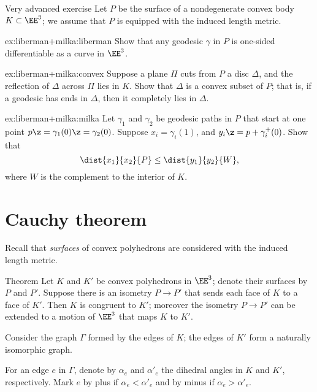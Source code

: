 \begin{thm}{Very advanced exercise}\label{ex:liberman+milka}
Let $P$ be the surface of a nondegenerate convex body $K\subset\EE^3$;
we assume that $P$ is equipped with the induced length metric.

\begin{subthm}{ex:liberman+milka:liberman}
Show that any geodesic $\gamma$ in $P$ is one-sided differentiable as a curve in $\EE^3$.
\end{subthm}

\begin{subthm}{ex:liberman+milka:convex}
Suppose a plane $\Pi$ cuts from $P$ a disc $\Delta$, and the reflection of $\Delta$ across $\Pi$ lies in $K$.
Show that $\Delta$ is a convex subset of $P$;
that is, if a geodesic has ends in $\Delta$, then it completely lies in $\Delta$.
\end{subthm}


\begin{subthm}{ex:liberman+milka:milka}
Let $\gamma_1$ and $\gamma_2$ be geodesic paths in $P$ that start at one point $p\z=\gamma_1(0)\z=\gamma_2(0)$.
Suppose $x_i=\gamma_i(1)$, and $y_i\z=p+\gamma_i^+(0)$.
Show that
\[\dist{x_1}{x_2}{P}\le \dist{y_1}{y_2}{W},\]
where $W$ is the complement to the interior of $K$.
\end{subthm}

\end{thm}


\section{Cauchy theorem}

Recall that \textit{surfaces} of convex polyhedrons are considered with the induced length metric.
 
\begin{thm}{Theorem}\label{thm:cauchy}
Let $K$ and $K'$ be convex polyhedrons in $\EE^3$;
denote their surfaces 
by $P$ and $P'$.
Suppose there is an isometry $P\to P'$ that sends each face of $K$ to a face of $K'$.
Then $K$ is congruent to $K'$; moreover the isometry $P\to P'$ can be extended to a motion of $\EE^3$ that maps $K$  to $K'$.
\end{thm}

Consider the graph $\Gamma$ formed by the edges of $K$;
the edges of $K'$ form a naturally isomorphic graph.
 
For an edge $e$ in $\Gamma$, denote by $\alpha_e$ and $\alpha'_e$ the dihedral angles in $K$ and $K'$, respectively.
Mark $e$ by plus if $\alpha_e < \alpha'_e$ and by minus if $\alpha_e > \alpha'_e$.

